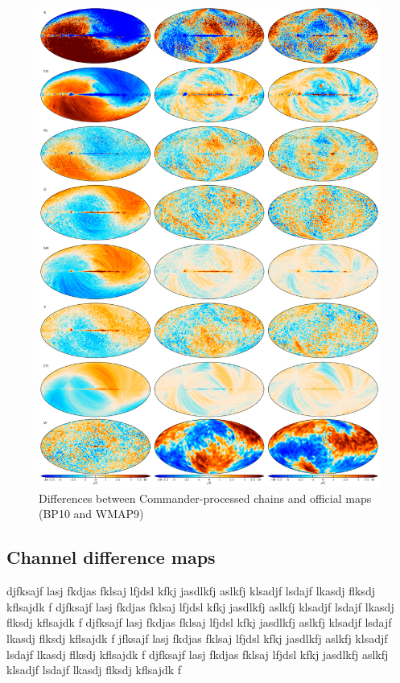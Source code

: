 \documentclass[twocolumn]{../../common/aa}
\begin{document}
\begin{figure}
	\centering
	\includegraphics[width=0.93\linewidth]{figures/megadiff.pdf}
	\caption{Differences between Commander-processed chains and official maps (BP10 and WMAP9)}
\end{figure}


\subsection{Channel difference maps}

djfksajf lasj fkdjas fklsaj lfjdsl kfkj jasdlkfj aslkfj klsadjf lsdajf lkasdj flksdj kflsajdk f
djfksajf lasj fkdjas fklsaj lfjdsl kfkj jasdlkfj aslkfj klsadjf lsdajf lkasdj flksdj kflsajdk f
djfksajf lasj fkdjas fklsaj lfjdsl kfkj jasdlkfj aslkfj klsadjf lsdajf lkasdj flksdj kflsajdk f
jfksajf lasj fkdjas fklsaj lfjdsl kfkj jasdlkfj aslkfj klsadjf lsdajf lkasdj flksdj kflsajdk f
djfksajf lasj fkdjas fklsaj lfjdsl kfkj jasdlkfj aslkfj klsadjf lsdajf lkasdj flksdj kflsajdk f
\end{document}

